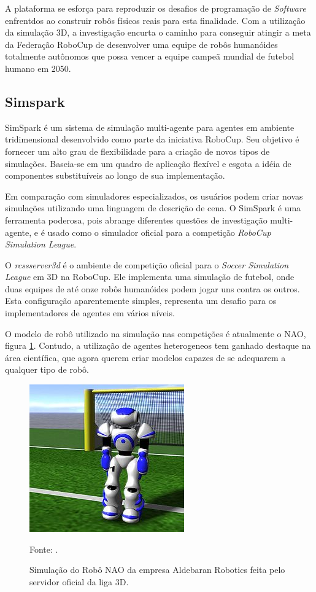 A plataforma se esforça para reproduzir os desafios de 
programação de {\it Software} enfrentdos ao construir robôs físicos reais para esta finalidade. Com a utilização da simulação 3D, 
a investigação encurta o caminho para conseguir atingir a meta da Federação RoboCup de desenvolver uma equipe de robôs humanóides 
totalmente autônomos que possa vencer a equipe campeã mundial de futebol humano em 2050.

\subsection{Simspark}
\label{subsec:simspark}
SimSpark  é um sistema de simulação multi-agente para agentes em ambiente tridimensional desenvolvido como
parte da iniciativa RoboCup. Seu objetivo é fornecer um alto grau de flexibilidade para a criação de novos tipos de simulações. 
Baseia-se em um quadro de aplicação flexível e esgota a idéia de componentes substituíveis ao longo de sua implementação. 

Em comparação com simuladores especializados, os usuários podem criar novas simulações utilizando uma linguagem de descrição de
cena. O SimSpark é uma ferramenta poderosa, pois abrange diferentes questões de investigação multi-agente, e é usado como o 
simulador oficial para a competição {\it RoboCup Simulation League}.

O {\it rcssserver3d} é o ambiente de competição oficial para o {\it Soccer Simulation League} em 3D na RoboCup. Ele implementa uma simulação
de futebol, onde duas equipes de até onze robôs humanóides podem jogar uns contra os outros. Esta configuração aparentemente 
simples, representa um desafio para os implementadores de agentes em vários níveis. 

O modelo de robô utilizado na simulação nas competições é atualmente o NAO, figura \ref{fig:naoColorido}. Contudo, a utilização de agentes
heterogeneos tem ganhado destaque na área científica, que agora querem criar modelos capazes de se adequarem a qualquer tipo de 
robô.

\begin{figure}[!htb]
\centering
\includegraphics[scale=0.6]{figuras/naoColorido.jpg}
\caption{Simulação do Robô NAO da empresa Aldebaran Robotics feita pelo servidor oficial da liga 3D.} Fonte: \cite{SimulationLeague}. \label{fig:naoColorido}
\end{figure}
\FloatBarrier
              
